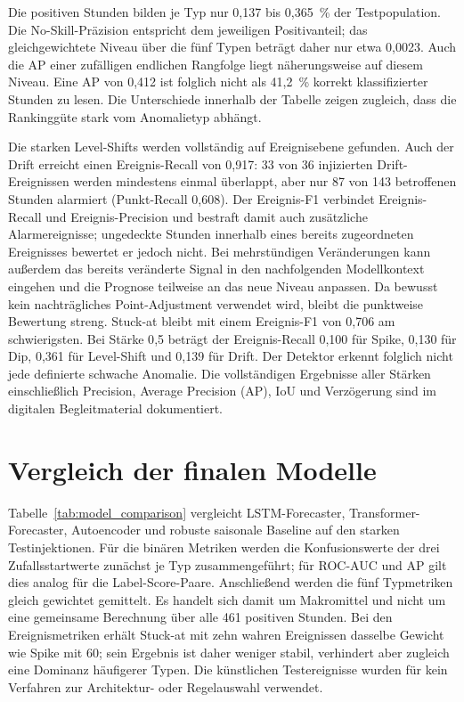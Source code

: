 Die positiven Stunden bilden je Typ nur 0{,}137 bis 0{,}365~\% der
Testpopulation. Die No-Skill-Präzision entspricht dem jeweiligen Positivanteil;
das gleichgewichtete Niveau über die fünf Typen beträgt daher nur etwa
0{,}0023. Auch die AP einer zufälligen endlichen Rangfolge liegt näherungsweise
auf diesem Niveau. Eine AP von 0{,}412 ist folglich nicht als 41{,}2~\% korrekt
klassifizierter Stunden zu lesen. Die Unterschiede innerhalb der Tabelle
zeigen zugleich, dass die Rankinggüte stark vom Anomalietyp abhängt.

Die starken Level-Shifts werden vollständig auf Ereignisebene gefunden. Auch
der Drift erreicht einen Ereignis-Recall von 0{,}917: 33 von 36 injizierten
Drift-Ereignissen werden mindestens einmal überlappt, aber nur 87 von 143
betroffenen Stunden alarmiert (Punkt-Recall 0{,}608). Der Ereignis-F1 verbindet
Ereignis-Recall und Ereignis-Precision und bestraft damit auch zusätzliche
Alarmereignisse; ungedeckte Stunden innerhalb eines bereits zugeordneten
Ereignisses bewertet er jedoch nicht. Bei mehrstündigen Veränderungen kann
außerdem das bereits veränderte Signal in den nachfolgenden Modellkontext
eingehen und die Prognose teilweise an das neue Niveau anpassen. Da bewusst
kein nachträgliches Point-Adjustment verwendet wird, bleibt die punktweise
Bewertung streng. Stuck-at bleibt mit
einem Ereignis-F1 von 0{,}706 am schwierigsten. Bei Stärke 0{,}5 beträgt der
Ereignis-Recall 0{,}100 für Spike, 0{,}130 für Dip, 0{,}361 für Level-Shift
und 0{,}139 für Drift. Der Detektor erkennt folglich nicht jede definierte
schwache Anomalie. Die vollständigen Ergebnisse aller Stärken einschließlich
Precision, Average Precision (AP), IoU und Verzögerung sind im digitalen
Begleitmaterial dokumentiert.

\section{Vergleich der finalen Modelle}
\label{sec:Ergebnisse_Modellvergleich}

Tabelle~\ref{tab:model_comparison} vergleicht LSTM-Forecaster,
Transformer-Forecaster, Autoencoder und robuste saisonale Baseline auf den
starken Testinjektionen. Für die binären Metriken werden die Konfusionswerte der
drei Zufallsstartwerte zunächst je Typ zusammengeführt; für ROC-AUC und AP gilt
dies analog für die Label-Score-Paare. Anschließend werden die fünf Typmetriken
gleich gewichtet gemittelt. Es handelt sich damit um Makromittel und nicht um
eine gemeinsame Berechnung über alle 461 positiven Stunden. Bei den
Ereignismetriken erhält Stuck-at mit zehn wahren Ereignissen dasselbe Gewicht
wie Spike mit 60; sein Ergebnis ist daher weniger stabil, verhindert aber
zugleich eine Dominanz häufigerer Typen.
Die künstlichen Testereignisse wurden für kein Verfahren zur
Architektur- oder Regelauswahl verwendet.

